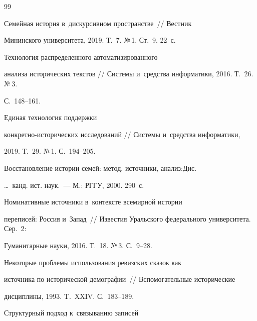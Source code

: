   


{\small\frenchspacing


{%




\begin{thebibliography}{99}




   Семейная история в~дискурсивном пространстве~/\!\!/ Вестник 


Мининского университета, 2019. Т.~7.  №\,1. Ст.~9. 22~с.




   Технология распределенного автоматизированного 


анализа исторических текстов /\!\!/ Системы и~средства информатики, 2016. Т.~26. №\,3. 


С.~148--161.




   Единая технология поддержки  


кон\-крет\-но-ис\-то\-ри\-че\-ских исследований /\!\!/ Системы и~средства информатики, 


2019. Т.~29. №\,1. С.~194--205.




   Восстановление истории семей: метод, источники, анализ:\linebreak Дис.\ 


\ldots\ канд. ист. наук.~--- М.: РГГУ, 2000. 290~с.




   Номинативные источники в~контексте всемирной истории 


переписей: Россия и~Запад~/\!\!/ Известия Уральского федерального университета. Сер.~2: 


Гуманитарные науки, 2016. Т.~18. №\,3. С.~9--28.




   Некоторые проблемы использования ревизских сказок как 


источника по исторической демографии~/\!\!/ Вспомогательные исторические 


дисциплины, 1993. T.~XXIV. С.~183--189.




   Структурный подход к~связыванию записей 



\end{thebibliography}}}
